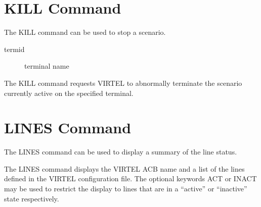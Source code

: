 \documentclass[letterpaper,10pt,english]{sphinxmanual}
\begin{document}
\newpage

\ignorespaces 

\section{KILL Command}
\label{\detokenize{audit_operations_ and_performance:kill-command}}\label{\detokenize{audit_operations_ and_performance:index-3}}
The KILL command can be used to stop a scenario.

\begin{sphinxVerbatim}[commandchars=\\\{\}]
\end{sphinxVerbatim}
\begin{description}
\item[{termid}] \leavevmode
terminal name

\end{description}

The KILL command requests VIRTEL to abnormally terminate the scenario currently active on the specified terminal.

\ignorespaces 

\section{LINES Command}
\label{\detokenize{audit_operations_ and_performance:lines-command}}\label{\detokenize{audit_operations_ and_performance:index-4}}
The LINES command can be used to display a summary of the line status.

\begin{sphinxVerbatim}[commandchars=\\\{\}]
    
\end{sphinxVerbatim}

The LINES command displays the VIRTEL ACB name and a list of the lines defined in the VIRTEL configuration file. The optional keywords ACT or INACT may be used to restrict the display to lines that are in a “active” or “inactive” state respectively.
\end{document}

